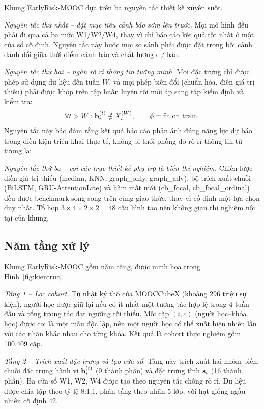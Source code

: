 Khung EarlyRisk-MOOC dựa trên ba nguyên tắc thiết kế xuyên suốt.

\textit{Nguyên tắc thứ nhất -- đặt mục tiêu cảnh báo sớm lên trước.} Mọi mô hình đều phải đi qua cả ba mức W1/W2/W4, thay vì chỉ báo cáo kết quả tốt nhất ở một cửa sổ cố định. Nguyên tắc này buộc mọi so sánh phải được đặt trong bối cảnh đánh đổi giữa thời điểm cảnh báo và chất lượng dự báo.

\textit{Nguyên tắc thứ hai -- ngăn rò rỉ thông tin tường minh.} Mọi đặc trưng chỉ được phép sử dụng dữ liệu đến tuần $W$, và mọi phép biến đổi (chuẩn hóa, điền giá trị thiếu) phải được khớp trên tập huấn luyện rồi mới áp sang tập kiểm định và kiểm tra:
\begin{equation}
\forall t > W : \mathbf{b}_i^{(t)} \notin X_i^{(W)}, \qquad \phi = \text{fit on train}.
\end{equation}
Nguyên tắc này bảo đảm rằng kết quả báo cáo phản ánh đúng năng lực dự báo trong điều kiện triển khai thực tế, không bị thổi phồng do rò rỉ thông tin từ tương lai.

\textit{Nguyên tắc thứ ba -- coi các trục thiết kế phụ trợ là biến thí nghiệm.} Chiến lược điền giá trị thiếu (median, KNN, graph\_only, graph\_adv), bộ trích xuất chuỗi (BiLSTM, GRU-AttentionLite) và hàm mất mát (cb\_focal, cb\_focal\_ordinal) đều được benchmark song song trên cùng giao thức, thay vì cố định một lựa chọn duy nhất. Tổ hợp $3 \times 4 \times 2 \times 2 = 48$ cấu hình tạo nên không gian thí nghiệm nội tại của khung.

\subsection{Năm tầng xử lý}

Khung EarlyRisk-MOOC gồm năm tầng, được minh họa trong Hình~\ref{fig:kientruc}.

\textit{Tầng 1 -- Lọc cohort.} Từ nhật ký thô của MOOCCubeX (khoảng 296 triệu sự kiện), người học được giữ lại nếu có ít nhất một tương tác hợp lệ trong 4 tuần đầu và tổng tương tác đạt ngưỡng tối thiểu. Mỗi cặp $(i, c)$ (người học--khóa học) được coi là một mẫu độc lập, nên một người học có thể xuất hiện nhiều lần với các nhãn khác nhau cho từng khóa. Kết quả là cohort thực nghiệm gồm 100.409 cặp.

\textit{Tầng 2 -- Trích xuất đặc trưng và tạo cửa sổ.} Tầng này trích xuất hai nhóm biến: chuỗi đặc trưng hành vi $\mathbf{b}_i^{(t)}$ (9 thành phần) và đặc trưng tĩnh $\mathbf{s}_i$ (16 thành phần). Ba cửa sổ W1, W2, W4 được tạo theo nguyên tắc chống rò rỉ. Dữ liệu được chia tập theo tỷ lệ 8:1:1, phân tầng theo nhãn 5 lớp, với hạt giống ngẫu nhiên cố định 42.

